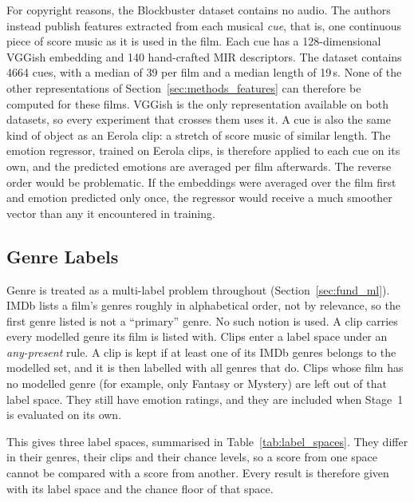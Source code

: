 For copyright reasons, the Blockbuster dataset contains no audio. The authors instead publish features extracted from each musical \emph{cue}, that is, one continuous piece of score music as it is used in the film. Each cue has a 128-dimensional VGGish embedding and 140 hand-crafted MIR descriptors. The dataset contains 4664 cues, with a median of 39 per film and a median length of 19\,s. None of the other representations of Section~\ref{sec:methods_features} can therefore be computed for these films. VGGish is the only representation available on both datasets, so every experiment that crosses them uses it. A cue is also the same kind of object as an Eerola clip: a stretch of score music of similar length. The emotion regressor, trained on Eerola clips, is therefore applied to each cue on its own, and the predicted emotions are averaged per film afterwards. The reverse order would be problematic. If the embeddings were averaged over the film first and emotion predicted only once, the regressor would receive a much smoother vector than any it encountered in training.

\subsection{Genre Labels}
\label{subsec:genre_labels}

Genre is treated as a multi-label problem throughout (Section~\ref{sec:fund_ml}). IMDb lists a film's genres roughly in alphabetical order, not by relevance, so the first genre listed is not a ``primary'' genre. No such notion is used. A clip carries every modelled genre its film is listed with. Clips enter a label space under an \emph{any-present} rule. A clip is kept if at least one of its IMDb genres belongs to the modelled set, and it is then labelled with all genres that do. Clips whose film has no modelled genre (for example, only Fantasy or Mystery) are left out of that label space. They still have emotion ratings, and they are included when Stage~1 is evaluated on its own.

This gives three label spaces, summarised in Table~\ref{tab:label_spaces}. They differ in their genres, their clips and their chance levels, so a score from one space cannot be compared with a score from another. Every result is therefore given with its label space and the chance floor of that space.

